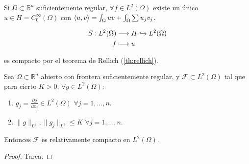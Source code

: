 \begin{example}
  Si $\Omega\subset \mathbb{R}^n$ suficientemente regular, $\forall f\in
  L^2(\Omega)$ existe un único $u\in H=\overline{C_0^\infty(\Omega)}$ con
  $\left\langle u,v\right\rangle=\int_\Omega uv + \int_\Omega \sum u_jv_j$.

  \begin{align*}
    S: L^2(\Omega) &\longrightarrow H \xhookrightarrow{} L^2(\Omega) \\
     f&\longmapsto u 
  \end{align*}

  es compacto por el teorema de Rellich (\ref{th:rellich}).
\end{example}

\begin{theorem}[Rellich]
  \label{th:rellich}
  Sea $\Omega\subset \mathbb{R}^n$ abierto con frontera suficientemente regular,
  y $\mathcal{F}\subset L^2(\Omega)$ tal que para cierto $K>0$, $\forall g\in
  L^2(\Omega)$:
  \begin{enumerate}
    \item $g_j=\frac{\partial g}{\partial x_j} \in L^2(\Omega)$ $\forall
      j=1,\ldots,n$.
    \item $\|g\|_{L^2},\|g_j\|_{L^2}\le K$ $\forall j=1,\ldots,n$.
  \end{enumerate}

  Entonces $\mathcal{F}$ es relativamente compacto en $L^2(\Omega)$.
\end{theorem}
\begin{proof}
  Tarea.
\end{proof}

